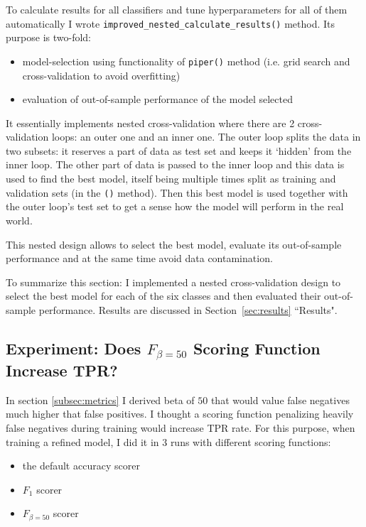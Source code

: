 \documentclass[10pt, a4paper]{article}
\begin{document}
To calculate results for all classifiers and tune hyperparameters for all of them automatically I wrote \texttt{improved\_nested\_calculate\_results()} method. Its purpose is two-fold:
\begin{itemize}
	\item model-selection using functionality of \texttt{piper()} method (i.e. grid search and cross-validation to avoid overfitting)
	\item evaluation of out-of-sample performance of the model selected
\end{itemize}
It essentially implements nested cross-validation where there are 2 cross-validation loops: an outer one and an inner one. The outer loop splits the data in two subsets: it reserves a part of data as test set and keeps it `hidden' from the inner loop. The other part of data is passed to the inner loop and this data is used to find the best model, itself being multiple times split as training and validation sets (in the \texttt{()} method). Then this best model is used together with the outer loop's test set to get a sense how the model will perform in the real world.

This nested design allows to select the best model, evaluate its out-of-sample performance and at the same time avoid data contamination.

To summarize this section: I implemented a nested cross-validation design to select the best model for each of the six classes and then evaluated their out-of-sample performance. Results are discussed in Section~\ref{sec:results} ``Results".

\subsection{Experiment: Does $F_{\beta=50}$ Scoring Function Increase TPR?}

In section \ref{subsec:metrics} I derived beta of $50$ that would value false negatives much higher that false positives. I thought a scoring function penalizing heavily false negatives during training would increase TPR rate. For this purpose, when training a refined model, I did it in 3 runs with different scoring functions:
\begin{itemize}
	\item the default accuracy scorer
	\item $F_1$ scorer
	\item $F_{\beta=50}$ scorer
\end{itemize}
\end{document}

